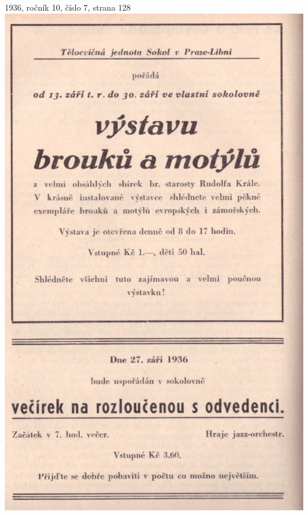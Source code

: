 \documentclass[11pt]{article}
\begin{document}
1936, ročník 10, číslo 7, strana 128 \\
\includegraphics[width=\imagewidth]{original/1936/Skener_20250323 (3).jpg}
\end{document}
